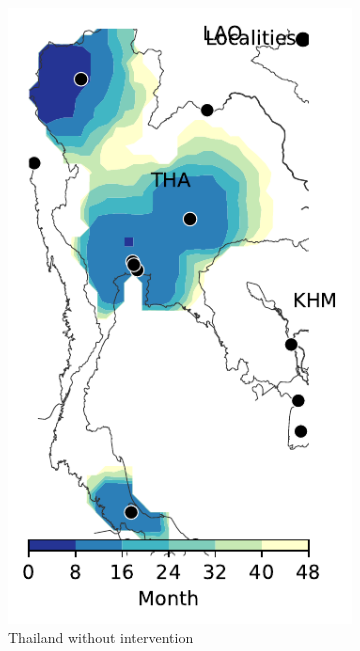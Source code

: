 \documentclass[11pt]{article}
\theoremstyle{definition}
\begin{document}
\begin{figure}[ht]
\begin{subfigure}[b]{.28\textwidth}
\includegraphics[width=\textwidth]{../cellular_automata/results/contour/TH_model-B_precip1_m1_l3.pdf}
\caption{Thailand without intervention\label{fig:thlBContour}}
\end{subfigure}
\begin{subfigure}[b]{.28\textwidth}

\end{subfigure}
\end{figure}
\end{document}

